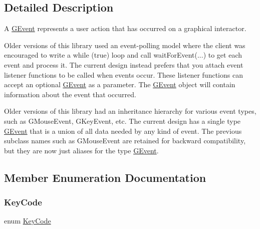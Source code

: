 \subsection{Detailed Description}
A \mbox{\hyperlink{classGEvent}{G\+Event}} represents a user action that has occurred on a graphical interactor. 

Older versions of this library used an event-\/polling model where the client was encouraged to write a while (true) loop and call wait\+For\+Event(...) to get each event and process it. The current design instead prefers that you attach event listener functions to be called when events occur. These listener functions can accept an optional \mbox{\hyperlink{classGEvent}{G\+Event}} as a parameter. The \mbox{\hyperlink{classGEvent}{G\+Event}} object will contain information about the event that occurred.

Older versions of this library had an inheritance hierarchy for various event types, such as G\+Mouse\+Event, G\+Key\+Event, etc. The current design has a single type \mbox{\hyperlink{classGEvent}{G\+Event}} that is a union of all data needed by any kind of event. The previous subclass names such as G\+Mouse\+Event are retained for backward compatibility, but they are now just aliases for the type \mbox{\hyperlink{classGEvent}{G\+Event}}. 

\subsection{Member Enumeration Documentation}
\mbox{\label{classGEvent_a7885f47644a0388f981f416fa20389b2}} 
\subsubsection{\texorpdfstring{Key\+Code}{KeyCode}}
{\footnotesize\ttfamily enum \mbox{\hyperlink{classGEvent_a7885f47644a0388f981f416fa20389b2}{Key\+Code}}}

